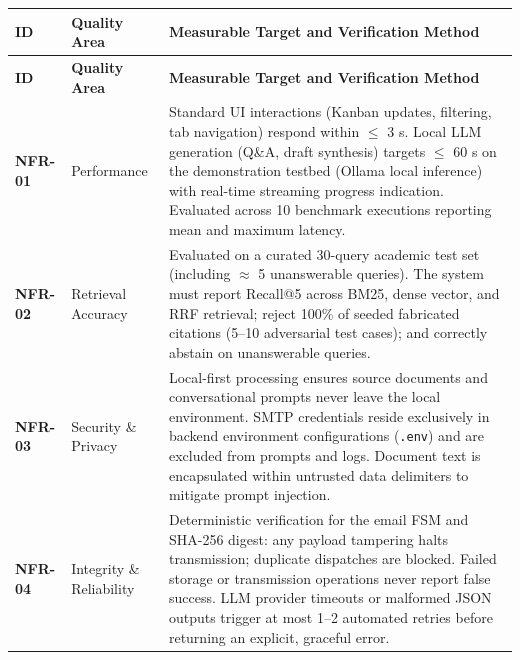 \begin{longtable}{>{\raggedright\arraybackslash}p{}>{\raggedright\arraybackslash}p{}>{\raggedright\arraybackslash}p{}}

\hline

\rowcolor{tablehead}

\textbf{ID} & \textbf{Quality Area} & \textbf{Measurable Target and Verification Method} \\ \hline

\endfirsthead

\hline

\rowcolor{tablehead}

\textbf{ID} & \textbf{Quality Area} & \textbf{Measurable Target and Verification Method} \\ \hline

\endhead

\endfoot

\endlastfoot

\textbf{NFR-01} & Performance & Standard UI interactions (Kanban updates, filtering, tab navigation) respond within $\le$ 3 s. Local LLM generation (Q\&A, draft synthesis) targets $\le$ 60 s on the demonstration testbed (Ollama local inference) with real-time streaming progress indication. Evaluated across 10 benchmark executions reporting mean and maximum latency. \\ \hline

\textbf{NFR-02} & Retrieval Accuracy & Evaluated on a curated 30-query academic test set (including $\approx$ 5 unanswerable queries). The system must report Recall@5 across BM25, dense vector, and RRF retrieval; reject 100\% of seeded fabricated citations (5–10 adversarial test cases); and correctly abstain on unanswerable queries. \\ \hline

\textbf{NFR-03} & Security \& Privacy & Local-first processing ensures source documents and conversational prompts never leave the local environment. SMTP credentials reside exclusively in backend environment configurations (\texttt{.env}) and are excluded from prompts and logs. Document text is encapsulated within untrusted data delimiters to mitigate prompt injection. \\ \hline

\textbf{NFR-04} & Integrity \& Reliability & Deterministic verification for the email FSM and SHA-256 digest: any payload tampering halts transmission; duplicate dispatches are blocked. Failed storage or transmission operations never report false success. LLM provider timeouts or malformed JSON outputs trigger at most 1–2 automated retries before returning an explicit, graceful error. \\ \hline


\end{longtable}
